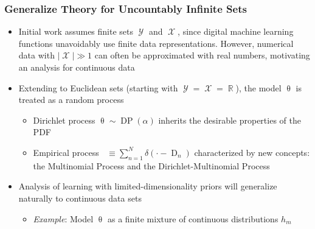 \documentclass[aspectratio=169,usenames,dvipsnames]{beamer}
\DeclareMathOperator{\Drm}{\mathrm{D}}
\DeclareMathOperator{\nbarrm}{\bar{\mathrm{n}}}
\DeclareMathOperator{\Xcal}{\mathcal{X}}
\DeclareMathOperator{\Ycal}{\mathcal{Y}}
\DeclareMathOperator{\Rbb}{\mathbb{R}}
\DeclareMathOperator{\DP}{\mathrm{DP}}
\begin{document}
\begin{frame}
\frametitle{Generalize Theory for Uncountably Infinite Sets}

\begin{itemize}
\item Initial work assumes finite sets $\Ycal$ and $\Xcal$, since digital machine learning functions unavoidably use finite data representations. However, numerical data with $|\Xcal| \gg 1$ can often be approximated with real numbers, motivating an analysis for \alert{continuous data}
\vspace{0.5em}
\item Extending to Euclidean sets (starting with $\Ycal = \Xcal = \Rbb$), the model $\uptheta$ is treated as a \alert{random process}
	\vspace{0.25em}
	\begin{itemize}
	\item Dirichlet process $\uptheta \sim \DP(\alpha)$ inherits the desirable properties of the PDF 
	\vspace{0.25em}
	\item Empirical process $\nbarrm \equiv \sum_{n=1}^N \delta\left( \cdot - \Drm_n \right)$ characterized by new concepts: the \alert{Multinomial Process} and the \alert{Dirichlet-Multinomial Process}
	\end{itemize}
\vspace{0.5em}
\item Analysis of learning with limited-dimensionality priors will generalize naturally to continuous data sets
	\vspace{0.25em}
	\begin{itemize}
	\item \emph{Example}: Model $\uptheta$ as a finite mixture of continuous distributions $h_m$
	\end{itemize}
\end{itemize}

\end{frame}
\end{document}
